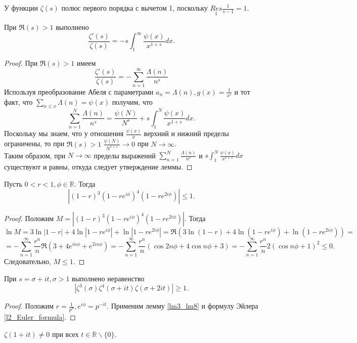 \begin{corollary} \label{l3_cor1}
	У функции $\zeta(s)$ полюс первого порядка с вычетом 1, поскольку $\displaystyle \underset{1}{Res} \frac{1}{s - 1} = 1$.
\end{corollary}

\begin{lemma} \label{l3_lm7}
	При $\Re(s) > 1$ выполнено 
	$$\frac{\zeta'(s)}{\zeta(s)} = -s \int_{1}^{\infty} \frac{\psi(x)}{x^{1 + s}}dx.$$
\end{lemma}

\begin{proof} 
	При $\Re(s) > 1$ имеем 
	$$\frac{\zeta'(s)}{\zeta(s)} = -\sum_{n = 1}^{\infty} \frac{\Lambda(n)}{n^s}$$ 
	Используя преобразование Абеля с параметрами $\displaystyle a_n = \Lambda(n), g(x) = \frac{1}{x^s}$ и тот факт, что $\displaystyle \sum_{n \leq x} \Lambda(n) = \psi(x)$ получим, что 
	$$\sum_{n = 1}^{N} \frac{\Lambda(n)}{n^s} = \frac{\psi(N)}{N^s} + s \int_{1}^{N} \frac{\psi(x)}{x^{1 + s}}dx.$$
	Поскольку мы знаем, что у отношения $\frac{\psi(x)}{x}$ верхний и нижний пределы ограничены, то при $\Re(s) > 1$  $\displaystyle \frac{\psi(N)}{N^{1 + s}} \rightarrow 0 $ при $N \rightarrow \infty$.\\
	Таким образом, при $N \rightarrow \infty$ пределы выражений $\displaystyle \sum_{n = 1}^{N} \frac{\Lambda(n)}{n^s}$ и  $\displaystyle s \int_{1}^{N} \frac{\psi(x)}{x^{1 + s}}dx$ существуют и равны, откуда следует утверждение леммы.
\end{proof}

\begin{lemma} \label{lm3_lm8}
	Пусть $0 < r < 1, \phi \in \mathbb{R}$. Тогда 
	$$|(1 - r)^3 (1 - re^{i \phi})^4 (1 - r e^{2 i \phi})| \leq 1.$$
\end{lemma}
\begin{proof}
	Положим $M = |(1 - r)^3 (1 - re^{i \phi})^4 (1 - r e^{2 i \phi})|$. Тогда 
	$$\ln M = 3 \ln |1 - r| + 4 \ln |1 - re^{i \phi}| + \ln |1 - r e^{2 i \phi}| = \Re \left( 3 \ln (1 - r) + 4 \ln (1 - re^{i \phi}) + \ln (1 - r e^{2 i \phi}) \right) = $$
	$$ = - \sum_{n = 1}^{\infty} \frac{r^n}{n} \Re \left( 3 + 4e^{i n \phi} + e^{2 i n \phi} \right) = - \sum_{n = 1}^{\infty} \frac{r^n}{n} \left( \cos 2n\phi + 4 \cos n\phi + 3 \right) = - \sum_{n = 1}^{\infty} \frac{r^n}{n} 2 \left( \cos n \phi + 1 \right)^2 \leq 0.$$
	Следовательно, $M \leq 1$.
\end{proof}

\begin{lemma} \label{l3_lm9}
	При $s = \sigma + i t, \sigma > 1$ выполнено неравенство 
	$$|\zeta^3(\sigma) \zeta^4(\sigma + it)  \zeta(\sigma + 2 i t)| \geq 1.$$
\end{lemma}
\begin{proof}
	Положим $\displaystyle r = \frac{1}{p^{\sigma}}, e^{i \phi} = p^{-i t}$. Применим лемму \ref{lm3_lm8} и формулу Эйлера \ref{l2_Euler_formula}. 
\end{proof}

\begin{theorem} \label{l3_thm6}
	$\zeta(1 + it) \ne 0 $ при всех $t \in \mathbb{R} \backslash \{0\}$.
\end{theorem}